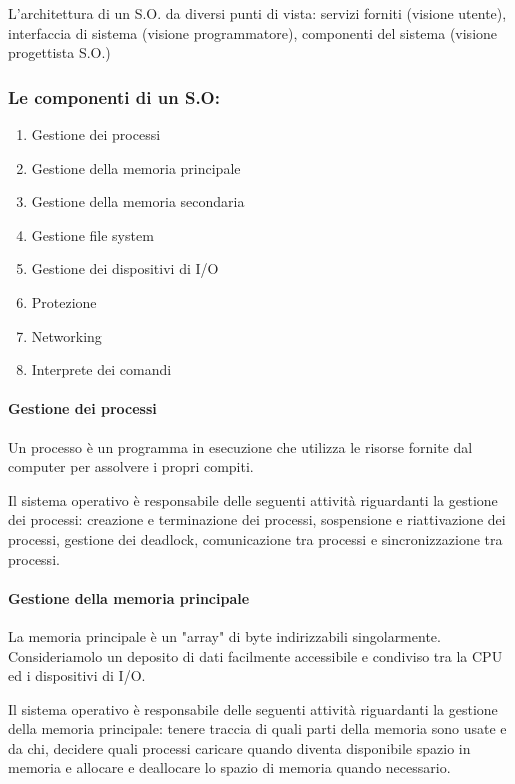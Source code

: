 L'architettura di un S.O. da diversi punti di vista:
servizi forniti (visione utente), interfaccia di sistema (visione programmatore), componenti del sistema (visione progettista S.O.)

\subsubsection{Le componenti di un S.O:}
\begin{enumerate}
    \item Gestione dei processi
    \item Gestione della memoria principale
    \item Gestione della memoria secondaria
    \item Gestione file system
    \item Gestione dei dispositivi di I/O
    \item Protezione
    \item Networking
    \item Interprete dei comandi
\end{enumerate}

\paragraph{Gestione dei processi}
Un processo è un programma in esecuzione che utilizza le risorse fornite dal computer per assolvere i propri compiti.

Il sistema operativo è responsabile delle seguenti attività riguardanti la gestione dei processi: creazione e terminazione dei processi, sospensione e riattivazione dei processi, gestione dei deadlock, comunicazione tra processi
e sincronizzazione tra processi.

\paragraph{Gestione della memoria principale}
La memoria principale è un "array" di byte indirizzabili singolarmente. Consideriamolo un deposito di dati facilmente accessibile e condiviso tra la CPU ed i dispositivi di I/O.

Il sistema operativo è responsabile delle seguenti attività
riguardanti la gestione della memoria principale: tenere traccia di quali parti della memoria sono usate e da chi, decidere quali processi caricare quando diventa disponibile spazio in memoria e allocare e deallocare lo spazio di memoria quando necessario.


